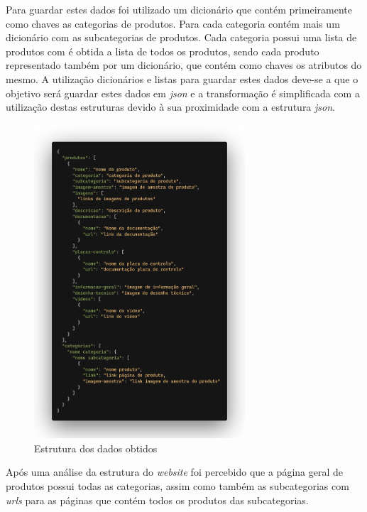 Para guardar estes dados foi utilizado um dicionário que contém primeiramente como chaves as categorias de produtos. Para cada categoria contém mais um dicionário com as subcategorias de produtos. Cada categoria possui uma lista de produtos com é obtida a lista de todos os produtos, sendo cada produto representado também por um dicionário, que contém como chaves os atributos do mesmo.
A utilização dicionários e listas para guardar estes dados deve-se a que o objetivo será guardar estes dados em \textit{json} e a transformação é simplificada com a utilização destas estruturas devido à sua proximidade com a estrutura \textit{json}.

\begin{figure}[htb]
    \centering
    
    \includegraphics[width=0.7\textwidth]{images/implementacao/scraper/estrutura_scraper.png}
    \caption{Estrutura dos dados obtidos}
    \label{fig:49}
\end{figure}

\newpage

Após uma análise da estrutura do \textit{website} foi percebido que a página geral de produtos possui todas as categorias, assim como também as subcategorias com \textit{urls} para as páginas que contém todos os produtos das subcategorias. 

